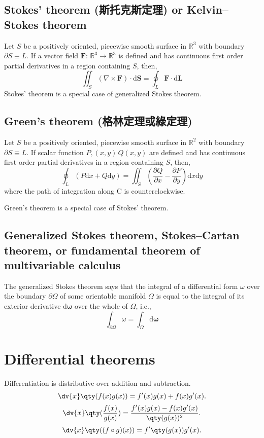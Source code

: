 \documentclass[a4paper,12pt]{report}
\begin{document}
\subsection{Stokes' theorem (斯托克斯定理) or Kelvin–Stokes theorem}
Let $S$ be a positively oriented, piecewise smooth surface in $\mathbb{R}^3$ with boundary $\partial S\equiv L$. If a vector field $\mathbf{F}:\,\mathbb{R}^3\rightarrow\mathbb{R}^3$ is defined and has continuous first order partial derivatives in a region containing $S$, then,
\[\iint_S(\nabla\times\mathbf{F})\cdot \mathrm{d}\mathbf{S}=\oint_{L}\mathbf{F}\cdot\mathrm{d}\mathbf{L}\]
Stokes' theorem is a special case of generalized Stokes theorem.
\subsection{Green's theorem (格林定理或綠定理)}
Let $S$ be a positively oriented, piecewise smooth surface in $\mathbb{R}^2$ with boundary $\partial S\equiv L$. If scalar function $P,(x,y)\,Q(x,y)$ are defined and has continuous first order partial derivatives in a region containing $S$, then,
\[\oint_L (P\mathrm{d}x+Q\mathrm{d}y)=\iint_S\left(\frac{\partial Q}{\partial x}-\frac{\partial P}{\partial y}\right)\mathrm{d}x\mathrm{d}y\]
where the path of integration along C is counterclockwise.

Green's theorem is a special case of Stokes' theorem.
\subsection{Generalized Stokes theorem, Stokes–Cartan theorem, or fundamental theorem of multivariable calculus}
The generalized Stokes theorem says that the integral of a differential form $\omega$ over the boundary $\partial\Omega$ of some orientable manifold $\Omega$ is equal to the integral of its exterior derivative $\mathrm{d}\boldsymbol{\omega}$ over the whole of $\Omega$, i.e.,
\[\int _{\partial\Omega}\omega=\int_{\Omega}\mathrm{d}\boldsymbol{\omega}\]



\section{Differential theorems}
Differentiation is distributive over addition and subtraction.
\[\dv{x}\qty(f(x)g(x))=f'(x)g(x)+f(x)g'(x).\]
\[\dv{x}\qty(\frac{f(x)}{g(x)})=\frac{f'(x)g(x)-f(x)g'(x)}{\qty(g(x))^2}.\]
\[\dv{x}\qty((f\circ g)(x))=f'\qty(g(x))g'(x).\]
\end{document}
